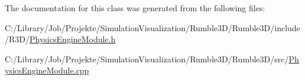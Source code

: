 The documentation for this class was generated from the following files\+:\begin{DoxyCompactItemize}
\item 
C\+:/\+Library/\+Job/\+Projekte/\+Simulation\+Visualization/\+Rumble3\+D/\+Rumble3\+D/include/\+R3\+D/\mbox{\hyperlink{_physics_engine_module_8h}{Physics\+Engine\+Module.\+h}}\item 
C\+:/\+Library/\+Job/\+Projekte/\+Simulation\+Visualization/\+Rumble3\+D/\+Rumble3\+D/src/\mbox{\hyperlink{_physics_engine_module_8cpp}{Physics\+Engine\+Module.\+cpp}}\end{DoxyCompactItemize}
